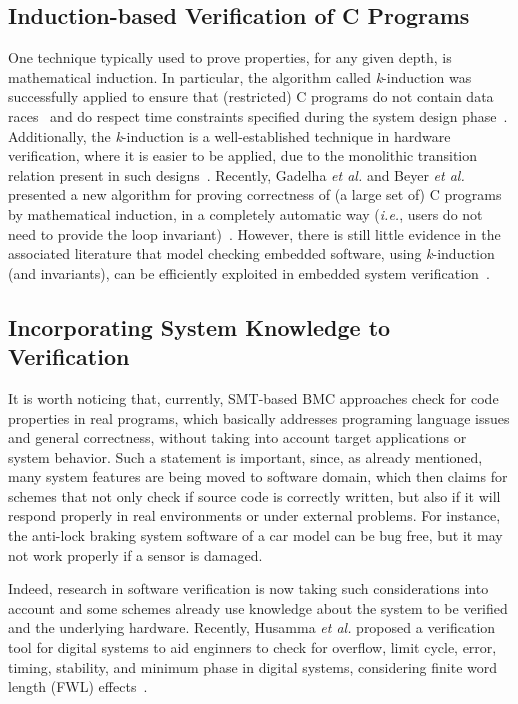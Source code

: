 \documentclass{acm_sen_article}
\begin{document}
\subsection{Induction-based Verification of C Programs}

One technique typically used to prove properties, for any given depth, is mathematical induction. In particular, the algorithm called \textit{k}-induction was successfully applied to ensure that (restricted) C programs do not contain data races~\cite{Donaldson10,Kinductor} and do respect time constraints specified during the system design phase~\cite{EenS03}. Additionally, the \textit{k}-induction is a well-established technique in hardware verification, where it is easier to be applied, due to the monolithic transition relation present in such designs~\cite{EenS03,GrosseLD09,Sheera00}. Recently, Gadelha {\it et al.} and Beyer {\it et al.} presented a new algorithm for proving correctness of (a large set of) C programs by mathematical induction, in a completely automatic way ({\it i.e.}, users do not need to provide the loop invariant)~\cite{Gadelha15,Beyer15}. However, there is still little evidence in the associated literature that model checking embedded software, using \textit{k}-induction (and invariants), can be efficiently exploited in embedded system verification~\cite{Rocha15}.

\subsection{Incorporating System Knowledge to Verification}

It is worth noticing that, currently, SMT-based BMC approaches check for code properties in real programs, which basically addresses programing language issues and general correctness, without taking into account target applications or system behavior. Such a statement is important, since, as already mentioned, many system features are being moved to software domain, which then claims for schemes that not only check if source code is correctly written, but also if it will respond properly in real environments or under external problems. For instance, the anti-lock braking system software of a car model can be bug free, but it may not work properly if a sensor is damaged.

Indeed, research in software verification is now taking such considerations into account and some schemes already use knowledge about the system to be verified and the underlying hardware. Recently, Husamma {\it et al.} proposed a verification tool for digital systems to aid enginners to check for overflow, limit cycle, error, timing, stability, and minimum phase in digital systems, considering finite word length (FWL) effects~\cite{dsv_spin2015}.
\end{document}
